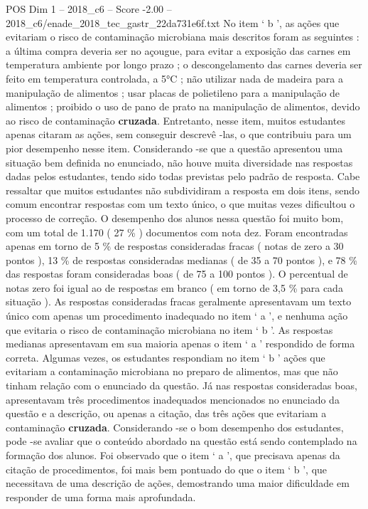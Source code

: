 \begin{textsample}{POS Dim 1 – 2018\_c6 – Score -2.00 – 2018\_c6/enade\_2018\_tec\_gastr\_22da731e6f.txt}
No item ‘ b ’, as ações que evitariam o risco de contaminação microbiana mais descritos foram as seguintes : a última compra deveria ser no açougue, para evitar a exposição das carnes em temperatura ambiente por longo prazo ; o descongelamento das carnes deveria ser feito em temperatura controlada, a 5{\EmojiFont °}C ; não utilizar nada de madeira para a manipulação de alimentos ; usar placas de polietileno para a manipulação de alimentos ; proibido o uso de pano de prato na manipulação de alimentos, devido ao risco de contaminação \textbf{cruzada}.
Entretanto, nesse item, muitos estudantes apenas citaram as ações, sem conseguir descrevê -las, o que contribuiu para um pior desempenho nesse item.
Considerando -se que a questão apresentou uma situação bem definida no enunciado, não houve muita diversidade nas respostas dadas pelos estudantes, tendo sido todas previstas pelo padrão de resposta.
Cabe ressaltar que muitos estudantes não subdividiram a resposta em dois itens, sendo comum encontrar respostas com um texto único, o que muitas vezes dificultou o processo de correção.
O desempenho dos alunos nessa questão foi muito bom, com um total de 1.170 ( 27 \% ) documentos com nota dez.
Foram encontradas apenas em torno de 5 \% de respostas consideradas fracas ( notas de zero a 30 pontos ), 13 \% de respostas consideradas medianas ( de 35 a 70 pontos ), e 78 \% das respostas foram consideradas boas ( de 75 a 100 pontos ).
O percentual de notas zero foi igual ao de respostas em branco ( em torno de 3,5 \% para cada situação ).
As respostas consideradas fracas geralmente apresentavam um texto único com apenas um procedimento inadequado no item ‘ a ’, e nenhuma ação que evitaria o risco de contaminação microbiana no item ‘ b ’.
As respostas medianas apresentavam em sua maioria apenas o item ‘ a ’ respondido de forma correta.
Algumas vezes, os estudantes respondiam no item ‘ b ’ ações que evitariam a contaminação microbiana no preparo de alimentos, mas que não tinham relação com o enunciado da questão.
Já nas respostas consideradas boas, apresentavam três procedimentos inadequados mencionados no enunciado da questão e a descrição, ou apenas a citação, das três ações que evitariam a contaminação \textbf{cruzada}.
Considerando -se o bom desempenho dos estudantes, pode -se avaliar que o conteúdo abordado na questão está sendo contemplado na formação dos alunos.
Foi observado que o item ‘ a ’, que precisava apenas da citação de procedimentos, foi mais bem pontuado do que o item ‘ b ’, que necessitava de uma descrição de ações, demostrando uma maior dificuldade em responder de uma forma mais aprofundada.

\end{textsample}
